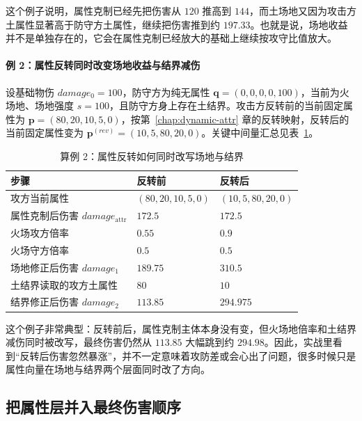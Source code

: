 这个例子说明，属性克制已经先把伤害从 $120$ 推高到 $144$，而土场地又因为攻击方土属性显著高于防守方土属性，继续把伤害推到约 $197.33$。也就是说，场地收益并不是单独存在的，它会在属性克制已经放大的基础上继续按攻守比值放大。

\paragraph{例 2：属性反转同时改变场地收益与结界减伤}
设基础物伤 $damage_0=100$，防守方为纯无属性 $\bm{q}=(0,0,0,0,100)$，当前为火场地、场地强度 $s=100$，且防守方身上存在土结界。攻击方反转前的当前固定属性为 $\bm{p}=(80,20,10,5,0)$，按第~\ref{chap:dynamic-attr} 章的反转映射，反转后的当前固定属性变为 $\bm{p}^{(rev)}=(10,5,80,20,0)$。关键中间量汇总见表~\ref{tab:damage-example-reverse}。

\begin{table}[H]
    \centering
    \caption{算例 2：属性反转如何同时改写场地与结界}
    \label{tab:damage-example-reverse}
    \begin{tabularx}{\textwidth}{>{\raggedright\arraybackslash}p{3.1cm} >{\raggedleft\arraybackslash}X >{\raggedleft\arraybackslash}X}
        \toprule
        步骤 & 反转前 & 反转后 \\
        \midrule
        攻方当前属性 & $(80,20,10,5,0)$ & $(10,5,80,20,0)$ \\
        属性克制后伤害 $damage_{\mathrm{attr}}$ & $172.5$ & $172.5$ \\
        火场攻方倍率 & $0.55$ & $0.9$ \\
        火场守方倍率 & $0.5$ & $0.5$ \\
        场地修正后伤害 $damage_1$ & $189.75$ & $310.5$ \\
        土结界读取的攻方土属性 & $80$ & $10$ \\
        结界修正后伤害 $damage_2$ & $113.85$ & $294.975$ \\
        \bottomrule
    \end{tabularx}
\end{table}

这个例子非常典型：反转前后，属性克制主体本身没有变，但火场地倍率和土结界减伤同时被改写，最终伤害仍然从 $113.85$ 大幅跳到约 $294.98$。因此，实战里看到“反转后伤害忽然暴涨”，并不一定意味着攻防差或会心出了问题，很多时候只是属性向量在场地与结界两个层面同时改了方向。

\subsection{把属性层并入最终伤害顺序}

